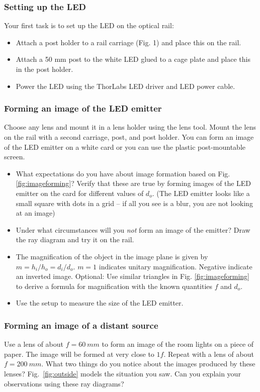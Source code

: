 \documentclass[a4paper]{report}
\begin{document}
	\subsubsection{Setting up the LED}
	Your first task is to set up the LED on the optical rail:
	\begin{itemize}
    \item Attach a post holder to a rail carriage (Fig. 1) and place this on the rail.
    \item Attach a 50 mm post to the white LED glued to a cage plate and place this in the post holder.
    \item Power the LED using the ThorLabs LED driver and LED power cable.
	\end{itemize}

	\subsubsection{Forming an image of the LED emitter}
	Choose any lens and mount it in a lens holder using the lens tool. 
	Mount the lens on the rail with a second carriage, post, and post holder. 
	You can form an image of the LED emitter on a white card or you can use the plastic post-mountable screen. 
	
    \begin{itemize}
	    \item What expectations do you have about image formation based on Fig. \ref{fig:imageforming}? Verify that these are true by forming images of the LED emitter on the card for different values of $d_o$. (The LED emitter looks like a small square with dots in a grid -- if all you see is a blur, you are not looking at an image)
	    \item Under what circumstances will you \emph{not} form an image of the emitter? Draw the ray diagram and try it on the rail.
	    \item The magnification of the object in the image plane is given by  $m = h_i / h_o = d_i / d_o$. $m=1$ indicates unitary magnification. Negative indicate an inverted image. 
	    Optional: Use similar triangles in Fig. \ref{fig:imageforming} to derive a formula for magnification with the known quantities $f$ and $d_o$.
		\item Use the setup to measure the size of the LED emitter.
	\end{itemize}

    \clearpage

	\subsubsection{Forming an image of a distant source}
    Use a lens of about $f=60~mm$ to form an image of the room lights on a piece of paper.
    The image will be formed at very close to $1f$.
    Repeat with a lens of about $f=200~mm$. 
    What two things do you notice about the images produced by these lenses? 
    Fig.~\ref{fig:outside} models the situation you saw. 
    Can you explain your observations using these ray diagrams?
    
\end{document}

